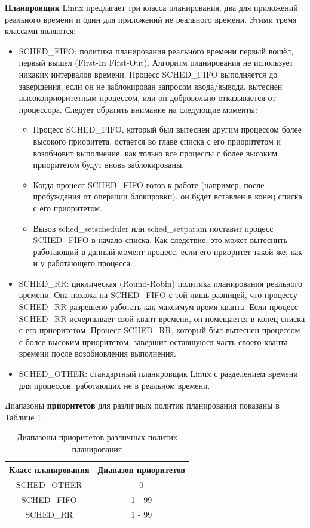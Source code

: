 \textbf{Планировщик} Linux предлагает три класса планирования, два для приложений реального времени и один для приложений не реального времени. Этими тремя классами являются:
\begin{itemize}
\item SCHED\_FIFO: политика планирования реального времени первый вошёл, первый вышел (First-In First-Out). Алгоритм планирования не использует никаких интервалов времени. Процесс SCHED\_FIFO выполняется до завершения, если он не заблокирован запросом ввода/вывода, вытеснен высокоприоритетным процессом, или он добровольно отказывается от процессора. Следует обратить внимание на следующие моменты:
\begin{itemize}
\item Процесс SCHED\_FIFO, который был вытеснен другим процессом более высокого приоритета, остаётся во главе списка с его приоритетом и возобновит выполнение, как только все процессы с более высоким приоритетом будут вновь заблокированы.
\item Когда процесс SCHED\_FIFO готов к работе (например, после пробуждения от операции блокировки), он будет вставлен в конец списка с его приоритетом.
\item Вызов sched\_setscheduler или sched\_setparam поставит процесс SCHED\_FIFO в начало списка. Как следствие, это может вытеснить работающий в данный момент процесс, если его приоритет такой же, как и у работающего процесса.
\end{itemize}
\item SCHED\_RR: циклическая (Round-Robin) политика планирования реального времени. Она похожа на SCHED\_FIFO с той лишь разницей, что процессу SCHED\_RR разрешено работать как максимум время кванта. Если процесс SCHED\_RR исчерпывает свой квант времени, он помещается в конец списка с его приоритетом. Процесс SCHED\_RR, который был вытеснен процессом с более высоким приоритетом, завершит оставшуюся часть своего кванта времени после возобновления выполнения.
\item SCHED\_OTHER: стандартный планировщик Linux с разделением времени для процессов, работающих не в реальном времени.
\end{itemize}

Диапазоны \textbf{приоритетов} для различных политик планирования показаны в Таблице 1.

\begin{table}
\caption{Диапазоны приоритетов различных политик планирования}
\centering
\begin{tabular}{|c|c|}
\hline 
Класс планирования & Диапазон приоритетов \\ 
\hline 
SCHED\_OTHER & 0 \\ 
\hline 
SCHED\_FIFO & 1 - 99 \\ 
\hline 
SCHED\_RR & 1 - 99 \\ 
\hline 
\end{tabular}
\end{table}

